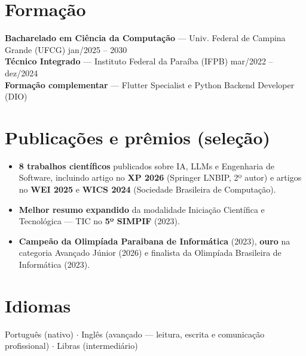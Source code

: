 \documentclass[10.5pt,a4paper]{article}
\begin{document}
\section*{Formação}
\textbf{Bacharelado em Ciência da Computação} --- Univ. Federal de Campina Grande (UFCG)
\hfill jan/2025 -- 2030\\
\textbf{Técnico Integrado} --- Instituto Federal da Paraíba (IFPB) \hfill mar/2022 -- dez/2024\\
\textbf{Formação complementar} --- Flutter Specialist e Python Backend Developer (DIO)

\section*{Publicações e prêmios (seleção)}
\begin{itemize}
  \item \textbf{8 trabalhos científicos} publicados sobre IA, LLMs e Engenharia de Software,
        incluindo artigo no \textbf{XP 2026} (Springer LNBIP, 2º autor) e artigos no
        \textbf{WEI 2025} e \textbf{WICS 2024} (Sociedade Brasileira de Computação).
  \item \textbf{Melhor resumo expandido} da modalidade Iniciação Científica e Tecnológica --- TIC
        no \textbf{5º SIMPIF} (2023).
  \item \textbf{Campeão da Olimpíada Paraibana de Informática} (2023), \textbf{ouro} na categoria
        Avançado Júnior (2026) e finalista da Olimpíada Brasileira de Informática (2023).
\end{itemize}

\section*{Idiomas}
Português (nativo) $\cdot$ Inglês (avançado --- leitura, escrita e comunicação profissional)
$\cdot$ Libras (intermediário)
\end{document}
